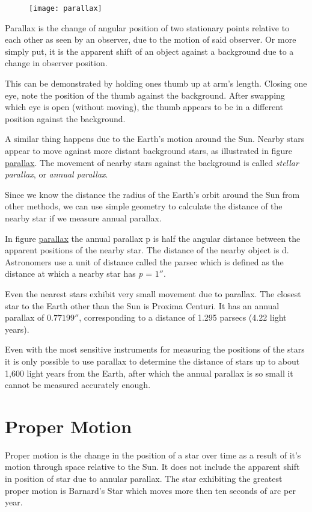 \begin{figure}[h]
\centering\texttt{[image: parallax]}
\end{figure}

Parallax is the change of angular position of two stationary points
relative to each other as seen by an observer, due to the motion of said
observer. Or more simply put, it is the apparent shift of an object
against a background due to a change in observer position.

This can be demonstrated by holding ones thumb up at arm's length.
Closing one eye, note the position of the thumb against the background.
After swapping which eye is open (without moving), the thumb appears to
be in a different position against the background.

A similar thing happens due to the Earth's motion around the Sun. Nearby
stars appear to move against more distant background stars, as
illustrated in figure \href{Astronomical_Concepts\#Parallax}{parallax}.
The movement of nearby stars against the background is called
\emph{stellar parallax}, or \emph{annual parallax}.

Since we know the distance the radius of the Earth's orbit around the
Sun from other methods, we can use simple geometry to calculate the
distance of the nearby star if we measure annual parallax.

In figure \href{Astronomical_Concepts\#Parallax}{parallax} the annual
parallax p is half the angular distance between the apparent positions
of the nearby star. The distance of the nearby object is d. Astronomers
use a unit of distance called the parsec which is defined as the
distance at which a nearby star has \emph{p} = $1''$.

Even the nearest stars exhibit very small movement due to parallax. The
closest star to the Earth other than the Sun is Proxima Centuri. It has
an annual parallax of $0.77199''$, corresponding to a distance of 1.295
parsecs (4.22 light years).

Even with the most sensitive instruments for measuring the positions of
the stars it is only possible to use parallax to determine the distance
of stars up to about 1,600 light years from the Earth, after which the
annual parallax is so small it cannot be measured accurately enough.

\section{Proper Motion}\label{proper-motion}

Proper motion is the change in the position of a star over time as a
result of it's motion through space relative to the Sun. It does not
include the apparent shift in position of star due to annular parallax.
The star exhibiting the greatest proper motion is Barnard's Star which
moves more then ten seconds of arc per year.


